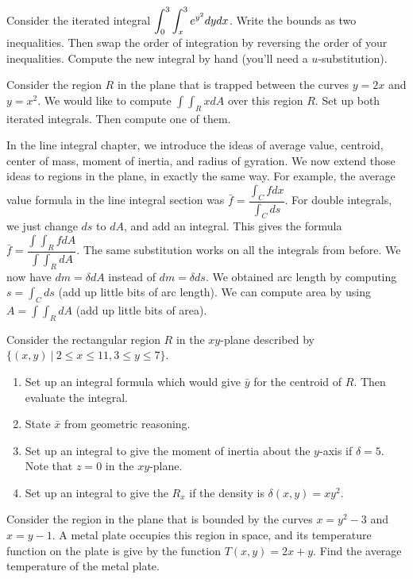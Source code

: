 \begin{problem}
Consider the iterated integral $\displaystyle \int_0^3\int_x^3 e^{y^2}dydx$. Write the bounds as two inequalities.  Then swap the order of integration by reversing the order of your inequalities.  Compute the new integral by hand (you'll need a $u$-substitution).
\end{problem}

\begin{problem}
Consider the region $R$ in the plane that is trapped between the curves $y=2x$ and $y=x^2$.  We would like to compute $\int\int_R x dA$ over this region $R$.  Set up both iterated integrals. Then compute one of them.
\end{problem}




In the line integral chapter, we introduce the ideas of average value, centroid, center of mass, moment of inertia, and radius of gyration.  We now extend those ideas to regions in the plane, in exactly the same way.  For example, the average value formula in the line integral section was $\bar f = \dfrac{\int_C fdx}{\int_C ds}$. For double integrals, we just change $ds$ to $dA$, and add an integral.  This gives the formula $\bar f = \dfrac{\int\int_R fdA}{\int\int_R dA}.$ The same substitution works on all the integrals from before.  We now have $dm = \delta dA$ instead of $dm=\delta ds$. We obtained arc length by computing $s=\int_C ds$ (add up little bits of arc length).  We can compute area by using $A=\int\int_R dA$ (add up little bits of area). 

\begin{problem}
Consider the rectangular region $R$ in the $xy$-plane described by $\{(x,y)\ |\ 2\leq x\leq 11, 3\leq y\leq 7\}$.
\begin{enumerate}
 \item Set up an integral formula which would give $\bar y$ for the centroid of $R$.  Then evaluate the integral.
 \item State $\bar x$ from geometric reasoning.
 \item Set up an integral to give the moment of inertia about the $y$-axis if $\delta=5$. Note that $z=0$ in the $xy$-plane.
 \item Set up an integral to give the $R_x$ if the density is $\delta(x,y)=xy^2$.
\end{enumerate}
\end{problem}

\begin{problem}
 Consider the region in the plane that is bounded by the curves $x=y^2-3$ and $x=y-1$.  A metal plate occupies this region in space, and its temperature function on the plate is give by the function $T(x,y)=2x+y$.  Find the average temperature of the metal plate.
\end{problem}

